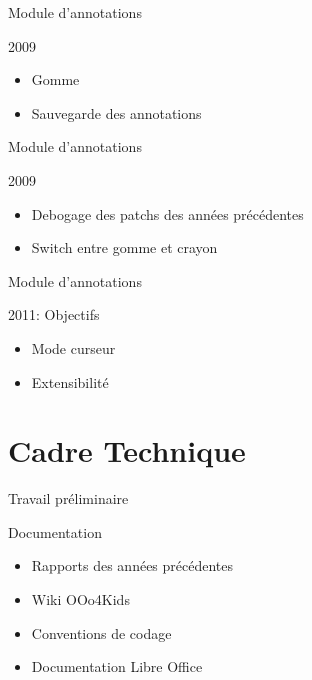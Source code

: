 \documentclass[handout]{beamer}
\begin{document}
\begin{frame}{Module d'annotations}
    \begin{block}{2009}
        \begin{itemize}[<+->]
            \item Gomme
	    \item Sauvegarde des annotations
        \end{itemize}
    \end{block}
\end{frame}

\begin{frame}{Module d'annotations}
    \begin{block}{2009}
        \begin{itemize}[<+->]
            \item Debogage des patchs des années précédentes
	    \item Switch entre gomme et crayon
        \end{itemize}
    \end{block}
\end{frame}

\begin{frame}{Module d'annotations}
    \begin{block}{2011: Objectifs}
        \begin{itemize}[<+->]
            \item Mode curseur
            \item Extensibilité
        \end{itemize}
    \end{block}
\end{frame}

\section{Cadre Technique}

\begin{frame}{Travail préliminaire}
    \begin{block}{Documentation}
        \begin{itemize}[<+->]
            \item Rapports des années précédentes
            \item Wiki OOo4Kids
            \item Conventions de codage
            \item Documentation Libre Office
        \end{itemize}
    \end{block}
\end{frame}
\end{document}
